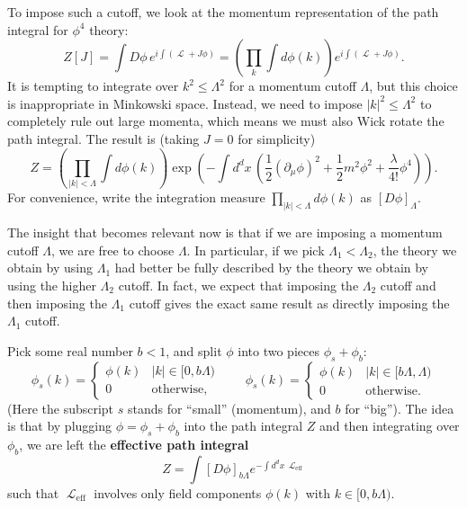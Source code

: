\documentclass{report}
\theoremstyle{plain}
\theoremstyle{definition}
\theoremstyle{remark}
\DeclareMathOperator{\cL}{\mathcal{L}}
\DeclareMathOperator{\eff}{eff}
\begin{document}
To impose such a cutoff, we look at the momentum representation of the
path integral for $\phi^4$ theory:
$$ Z[J] = \int D\phi \, e^{i\int(\cL + J\phi)} = \left(\prod_k \int d\phi(k)\right) e^{i\int(\cL + J\phi)}. $$
It is tempting to integrate over $k^2 \le \Lambda^2$ for a momentum
cutoff $\Lambda$, but this choice is inappropriate in Minkowski space.
Instead, we need to impose $|k|^2 \le \Lambda^2$ to completely rule
out large momenta, which means we must also Wick rotate the path
integral. The result is (taking $J = 0$ for simplicity)
$$ Z = \left(\prod_{|k| < \Lambda} \int d\phi(k)\right) \exp\left(-\int d^dx \, \left(\frac{1}{2}(\partial_\mu\phi)^2 + \frac{1}{2}m^2\phi^2 + \frac{\lambda}{4!} \phi^4\right)\right). $$
For convenience, write the integration measure
$\prod_{|k| < \Lambda} d\phi(k)$ as $[D\phi]_\Lambda$.

The insight that becomes relevant now is that if we are imposing a
momentum cutoff $\Lambda$, we are free to choose $\Lambda$. In
particular, if we pick $\Lambda_1 < \Lambda_2$, the theory we obtain
by using $\Lambda_1$ had better be fully described by the theory we
obtain by using the higher $\Lambda_2$ cutoff. In fact, we expect that
imposing the $\Lambda_2$ cutoff and then imposing the $\Lambda_1$
cutoff gives the exact same result as directly imposing the
$\Lambda_1$ cutoff.

Pick some real number $b < 1$, and split $\phi$ into two pieces
$\phi_s + \phi_b$:
$$ \phi_s(k) = \begin{cases} \phi(k) & |k| \in [0, b\Lambda) \\ 0 & \text{otherwise}, \end{cases} \qquad \phi_s(k) = \begin{cases} \phi(k) & |k| \in [b\Lambda, \Lambda) \\ 0 & \text{otherwise}. \end{cases} $$
(Here the subscript $s$ stands for ``small'' (momentum), and $b$ for
``big''). The idea is that by plugging $\phi = \phi_s + \phi_b$ into
the path integral $Z$ and then integrating over $\phi_b$, we are left
the {\bf effective path integral}
$$ Z = \int [D\phi]_{b\Lambda} e^{-\int d^dx \, \cL_{\eff}} $$
such that $\cL_{\eff}$ involves only field components $\phi(k)$ with
$k \in [0, b\Lambda)$.
\end{document}
